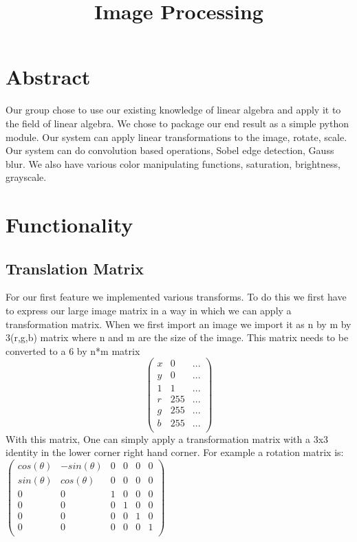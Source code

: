 \documentclass[11pt]{article}
\title{\textbf{Image Processing}}
\author{}
\date{}
\begin{document}
\maketitle

\section{Abstract}
Our group chose to use our existing knowledge of linear algebra and apply it to the field of linear algebra. We chose to package our end result as a simple python module. Our system can apply linear transformations to the image, rotate, scale. Our system can do convolution based operations, Sobel edge detection, Gauss blur. We also have various color manipulating functions, saturation, brightness, grayscale.

\section{Functionality}
\subsection{Translation Matrix}
For our first feature we implemented various transforms. To do this we first have to express our large image matrix in a way in which we can apply a transformation matrix. When we first import an image we import it as n by m by 3(r,g,b) matrix where n and m are the size of the image. This matrix needs to be converted to a 6 by n*m matrix
$$\begin{pmatrix}
	x & 0 & ...\\
	y & 0 & ...\\
	1 & 1 & ...\\
	r &  255 & ...\\
	g & 255 & ...\\
	b & 255 & ...\\
\end{pmatrix}$$
 With this matrix, One can simply apply a transformation matrix with a 3x3 identity in the lower corner right hand corner. For example a rotation matrix is:
 $\begin{pmatrix}
	cos(\theta) & -sin(\theta) & 0 & 0 & 0 & 0\\
	sin(\theta) & cos(\theta) & 0 & 0 & 0 & 0\\
	0 & 0 & 1 & 0 & 0 & 0\\
	0 & 0 & 0 & 1 & 0 & 0\\
	0 & 0 & 0 & 0 & 1 & 0\\
	0 & 0 & 0 & 0 & 0 & 1\\
\end{pmatrix}$
\end{document}
